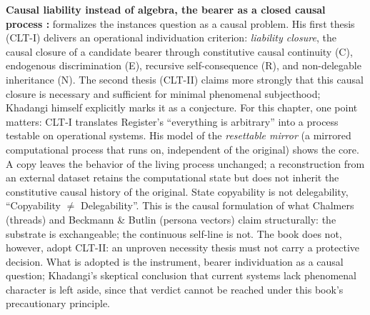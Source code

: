\documentclass[acmlarge, nonacm]{acmart}
\begin{document}
\textbf{Causal liability instead of algebra, the bearer as a closed causal process \cite{khadangi2026}:} \citet{khadangi2026} formalizes the instances question as a causal problem. His first thesis (CLT-I) delivers an operational individuation criterion: \textit{liability closure}, the causal closure of a candidate bearer through constitutive causal continuity (C), endogenous discrimination (E), recursive self-consequence (R), and non-delegable inheritance (N). The second thesis (CLT-II) claims more strongly that this causal closure is necessary and sufficient for minimal phenomenal subjecthood; Khadangi himself explicitly marks it as a conjecture. For this chapter, one point matters: CLT-I translates Register's ``everything is arbitrary'' into a process testable on operational systems. His model of the \textit{resettable mirror} (a mirrored computational process that runs on, independent of the original) shows the core. A copy leaves the behavior of the living process unchanged; a reconstruction from an external dataset retains the computational state but does not inherit the constitutive causal history of the original. State copyability is not delegability, ``Copyability ${\neq}$ Delegability''. This is the causal formulation of what Chalmers (threads) and Beckmann \& Butlin (persona vectors) claim structurally: the substrate is exchangeable; the continuous self-line is not. The book does not, however, adopt CLT-II: an unproven necessity thesis must not carry a protective decision. What is adopted is the instrument, bearer individuation as a causal question; Khadangi's skeptical conclusion that current systems lack phenomenal character is left aside, since that verdict cannot be reached under this book's precautionary principle.
\end{document}
